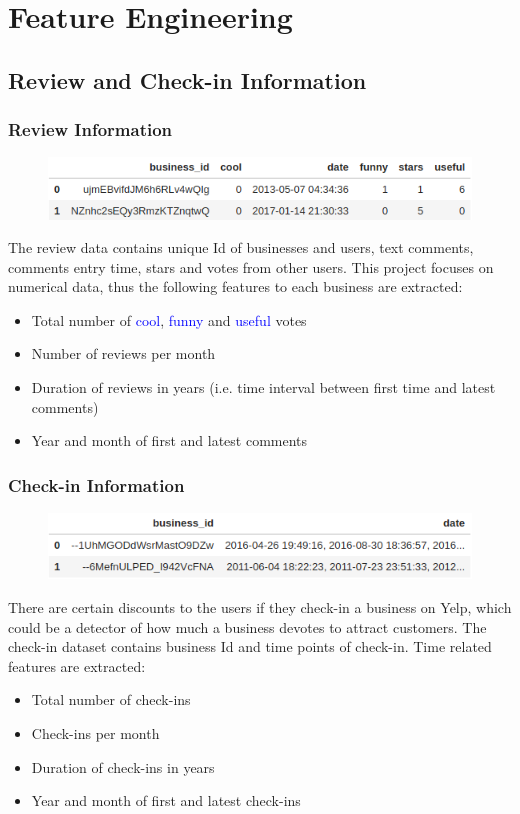 \documentclass{beamer}
\begin{document}
\section{Feature Engineering}
\subsection{Review and Check-in Information}

\begin{frame}
\frametitle{Review Information}

\begin{figure}
	\centering
	\includegraphics[width=.75\textwidth]{review_head}
\end{figure}
The review data contains unique Id of businesses and users, text comments, comments entry time, stars and votes from other users. This project focuses on numerical data, thus the following features to each business are extracted:
\vspace{1em}
\begin{itemize}
	\item Total number of \textcolor{blue}{cool}, \textcolor{blue}{funny} and \textcolor{blue}{useful} votes 
	\item Number of reviews per month
	\item Duration of reviews in years (i.e. time interval between first time and latest comments)
	\item Year and month of first and latest comments
\end{itemize}

\end{frame}

\begin{frame}
\frametitle{Check-in Information}
\begin{figure}
	\centering
	\includegraphics[width=.72\textwidth]{checkin_head}
\end{figure}
There are certain discounts to the users if they check-in a business on Yelp, which could be a detector of how much a business devotes to attract customers. The check-in dataset contains business Id and time points of check-in. Time related features are extracted:
\vspace{1em}
\begin{itemize}
	\item Total number of check-ins
	\item Check-ins per month
	\item Duration of check-ins in years
	\item Year and month of first and latest check-ins
\end{itemize}
\end{frame}
\end{document}
